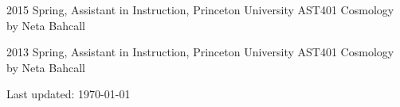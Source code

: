 \documentclass[11pt,letterpaper]{article}
\renewenvironment{itemize}{
  \begin{list}{}{
    \setlength{\leftmargin}{1.5em}
  }
}{
  \end{list}
}
\begin{document}
\begin{itemize}
  \setlength\itemsep{0em}
  \item 2015 Spring, Assistant in Instruction, Princeton University
    AST401 Cosmology by Neta Bahcall
  \item 2013 Spring, Assistant in Instruction, Princeton University
    AST401 Cosmology by Neta Bahcall
\end{itemize}

\bigskip

\begin{center}
  \begin{footnotesize}
    Last updated: \today \\
  \end{footnotesize}
\end{center}
\end{document}
